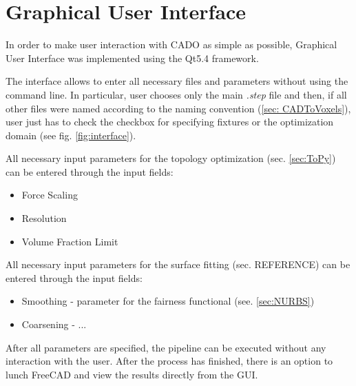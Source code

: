 \section{Graphical User Interface}
\label{sec:gui}
In order to make user interaction with CADO as simple as possible, Graphical User Interface was implemented using the Qt5.4 \cite{Qt} framework. 

The interface allows to enter all necessary files and parameters without using the command line. In particular, user chooses only the main \textit{.step} file and then, if all other files were named according to the naming convention (\ref{sec: CADToVoxels}), user just has to check the checkbox for specifying fixtures or the optimization domain (see fig. \ref{fig:interface}).

All necessary input parameters for the topology optimization (sec. \ref{sec:ToPy}) can be entered through the input fields:
\begin{itemize}
\item Force Scaling
\item Resolution
\item Volume Fraction Limit
\end{itemize}

All necessary input parameters for the surface fitting (sec. REFERENCE) can be entered through the input fields:
\begin{itemize}
\item Smoothing - parameter for the fairness functional (see. \ref{sec:NURBS})
\item Coarsening - ...
\end{itemize}


After all parameters are specified, the pipeline can  be executed without any interaction with the user. After the process has finished, there is an option to lunch FreeCAD and view the results directly from the GUI.


